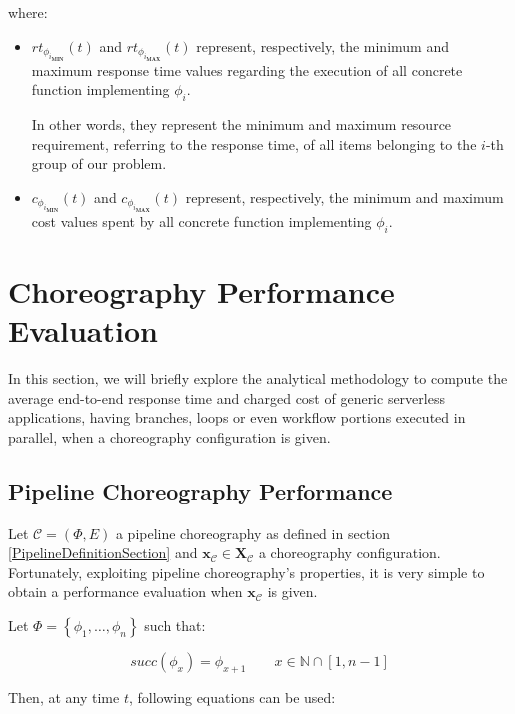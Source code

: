 \documentclass[12pt,a4paper]{report}
\newcommand{\N}{\mathbb{N}}
\newcommand{\SetFromOneTo}[1]{\N \cap \left[1,#1\right]}
\begin{document}
where:

\begin{itemize}
	\item $rt_{\phi_{i_{\textbf{MIN}}}}(t)$ and $rt_{\phi_{i_{\textbf{MAX}}}}(t)$ represent, respectively, the minimum and maximum response time values regarding the execution of all concrete function implementing $\phi_i$. 
	
	In other words, they represent the minimum and maximum resource requirement, referring to the response time, of all items belonging to the $i$-th group of our problem.
	
	\item $c_{\phi_{i_{\textbf{MIN}}}}(t)$ and $c_{\phi_{i_{\textbf{MAX}}}}(t)$ represent, respectively, the minimum and maximum cost values spent by all concrete function implementing $\phi_i$.
\end{itemize}




\section{Choreography Performance Evaluation}

In this section, we will briefly explore the analytical methodology to compute the average end-to-end response time and charged cost of generic serverless applications, having branches, loops or even workflow portions executed in parallel, when a choreography configuration is given.

\subsection{Pipeline Choreography Performance}

Let $\mathcal{C} = (\Phi,E)$ a pipeline choreography as defined in section \ref{PipelineDefinitionSection} and $\textbf{x}_{\mathcal{C}} \in \textbf{X}_{\mathcal{C}}$ a choreography configuration. Fortunately, exploiting pipeline choreography's properties, it is very simple to obtain a performance evaluation when $\textbf{x}_{\mathcal{C}}$ is given. 

Let $\Phi = \left\{\phi_1, \ldots, \phi_n \right\}$ such that:

\begin{equation}
	succ(\phi_x) = \phi_{x+1}  \qquad x \in \SetFromOneTo{n -1}
\end{equation}


Then, at any time $t$, following equations can be used:
\end{document}
